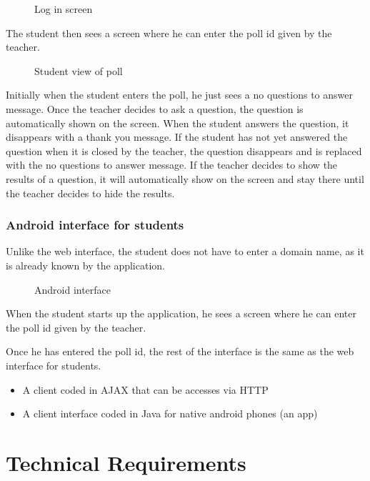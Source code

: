 \documentclass{acm_proc_article-sp}
\begin{document}
\begin{figure}[h]
\centering
{}
\caption{Log in screen}
\label{fig:teacher_interface}
\end{figure}


The student then sees a screen where he can enter the poll id given by the teacher.

\begin{figure}[h]
\centering
{}
\caption{Student view of poll}
\label{fig:poll}
\end{figure}


Initially when the student enters the poll, he just sees a no questions to answer message. Once the teacher decides to ask a question, the question is automatically shown on the screen. When the student answers the question, it disappears with a thank you message. If the student has not yet answered the question when it is closed by the teacher, the question disappears and is replaced with the no questions to answer message. If the teacher decides to show the results of a question, it will automatically show on the screen and stay there until the teacher decides to hide the results.
\subsubsection{Android interface for students}
Unlike the web interface, the student does not have to enter a domain name, as it is already known by the application.

\begin{figure}[h]
\centering
{}
\caption{Android interface}
\label{fig:android_interface}
\end{figure}

When the student starts up the application, he sees a screen where he can enter the poll id given by the teacher.

Once he has entered the poll id, the rest of the interface is the same as the web interface for students.


\begin{itemize}
  \item A client coded in AJAX that can be accesses via HTTP
  \item A client interface coded in Java for native android phones (an app)
\end{itemize}

\section{Technical Requirements}
\thispagestyle{fancy}%
\end{document}
